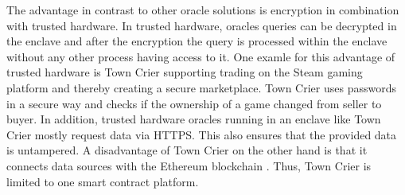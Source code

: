 \documentclass[conference]{IEEEtran}
\begin{document}
The advantage in contrast to other oracle solutions is encryption in combination with trusted hardware. In trusted hardware, oracles queries can be decrypted in the enclave and after the encryption the query is processed within the enclave without any other process having access to it. One examle for this advantage of trusted hardware is Town Crier supporting trading on the Steam gaming platform and thereby creating a secure marketplace. Town Crier uses passwords in a secure way and checks if the ownership of a game changed from seller to buyer. In addition, trusted hardware oracles running in an enclave like Town Crier mostly request data via HTTPS. This also ensures that the provided data is untampered. \cite{Ellis2017} A disadvantage of Town Crier on the other hand is that it connects data sources with the Ethereum blockchain \cite{Zhang2016}. Thus, Town Crier is limited to one smart contract platform.
%
%

\end{document}
